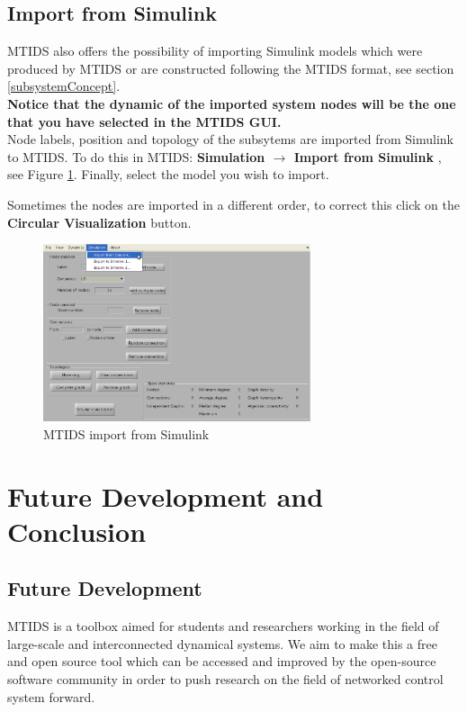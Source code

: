 \documentclass[a4paper,twoside, openright,12pt]{report}
\begin{document}
 


\section{Import from Simulink}

MTIDS also offers the possibility of importing Simulink models which were produced by MTIDS or are constructed following the MTIDS format, 
see section \ref{subsystemConcept}.\\

\textbf{Notice that the dynamic of the imported system nodes will be the one that you have selected in the MTIDS GUI.}
\\

Node labels, position and topology of the subsytems are imported from Simulink to MTIDS.
To do this in MTIDS: \textbf{Simulation $\rightarrow$ Import from Simulink }, see Figure \ref{mtidsImportFig}. Finally, select the model you wish to import.

Sometimes the nodes are imported in a different order, to correct this click on the \textbf{Circular Visualization} button. 

\begin{figure}[htb]
\centering
\includegraphics[width=0.7\textwidth]{pics/mtidsImport.eps}
\caption[MTIDS import from Simulink]{MTIDS import from Simulink}
\label{mtidsImportFig}
\end{figure} 

\chapter{Future Development and Conclusion}


\section{Future Development}

MTIDS is a toolbox aimed for students and researchers working in the field of large-scale and interconnected dynamical systems. 
We aim to make this a free and open source tool which can be accessed and improved by the open-source software community in order to
 push research on the field of networked control system forward.\\
\end{document}
